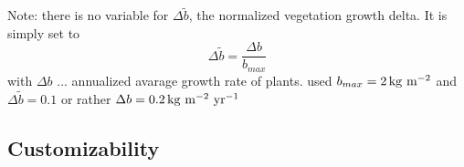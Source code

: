 Note: there is no variable for $\Delta \tilde{b}$, the normalized vegetation growth delta. It is simply set to 
\[
\Delta \tilde{b} = \frac{\Delta b}{b_{max}}
\]
with $\Delta b$ ... annualized avarage growth rate of plants. \citet{gav2012} used $b_{max} = \unit[2]{kg\ m^{-2}}$ and $\Delta \tilde{b} =0.1$ or rather $\Delta b = \unit[0.2]{kg\ m^{-2}\ yr^{-1}}$

\subsection{Customizability}